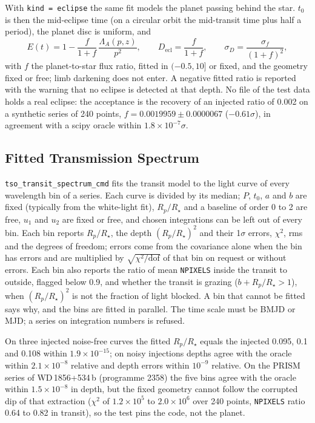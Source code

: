 \documentclass[11pt,a4paper]{article}
\newcommand{\code}[1]{\texttt{\small #1}}
\begin{document}
    With \code{kind = eclipse} the same fit models the planet passing behind the star. $t_0$ is then the mid-eclipse time (on a circular orbit the mid-transit time plus half a period), the planet disc is uniform, and
    \begin{equation}
        E(t) = 1 - \frac{f}{1 + f}\,\frac{\Lambda_A(p, z)}{p^2}, \qquad D_{\text{ecl}} = \frac{f}{1 + f}, \qquad \sigma_{D} = \frac{\sigma_f}{(1 + f)^2},
    \end{equation}
    with $f$ the planet-to-star flux ratio, fitted in $(-0.5, 10]$ or fixed, and the geometry fixed or free; limb darkening does not enter. A negative fitted ratio is reported with the warning that no eclipse is detected at that depth. No file of the test data holds a real eclipse: the acceptance is the recovery of an injected ratio of 0.002 on a synthetic series of 240 points, $f = 0.0019959 \pm 0.0000067$ ($-0.61\sigma$), in agreement with a scipy oracle within $1.8 \times 10^{-7}\sigma$.

    \subsection{Fitted Transmission Spectrum}
    \label{sec:transit_spectrum}

    \code{tso\_transit\_spectrum\_cmd} fits the transit model to the light curve of every wavelength bin of a series. Each curve is divided by its median; $P$, $t_0$, $a$ and $b$ are fixed (typically from the white-light fit), $R_p/R_\star$ and a baseline of order 0 to 2 are free, $u_1$ and $u_2$ are fixed or free, and chosen integrations can be left out of every bin. Each bin reports $R_p/R_\star$, the depth $(R_p/R_\star)^2$ and their 1$\sigma$ errors, $\chi^2$, rms and the degrees of freedom; errors come from the covariance alone when the bin has errors and are multiplied by $\sqrt{\chi^2/\text{dof}}$ of that bin on request or without errors. Each bin also reports the ratio of mean \code{NPIXELS} inside the transit to outside, flagged below 0.9, and whether the transit is grazing ($b + R_p/R_\star > 1$), when $(R_p/R_\star)^2$ is not the fraction of light blocked. A bin that cannot be fitted says why, and the bins are fitted in parallel. The time scale must be BMJD or MJD; a series on integration numbers is refused.

    On three injected noise-free curves the fitted $R_p/R_\star$ equals the injected 0.095, 0.1 and 0.108 within $1.9 \times 10^{-15}$; on noisy injections depths agree with the oracle within $2.1 \times 10^{-8}$ relative and depth errors within $10^{-9}$ relative. On the PRISM series of WD\,1856+534\,b (programme 2358) the five bins agree with the oracle within $1.5 \times 10^{-8}$ in depth, but the fixed geometry cannot follow the corrupted dip of that extraction ($\chi^2$ of $1.2 \times 10^5$ to $2.0 \times 10^6$ over 240 points, \code{NPIXELS} ratio 0.64 to 0.82 in transit), so the test pins the code, not the planet.
\end{document}
